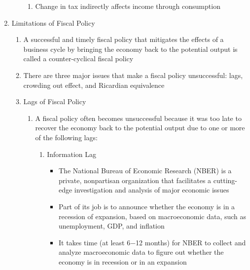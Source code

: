 \documentclass[12pt]{article}
\begin{document}
\begin{enumerate}
\begin{enumerate}
\begin{enumerate}
              \item Change in tax indirectly affects income through consumption

            \end{enumerate}

        \end{enumerate}

      \item Limitations of Fiscal Policy

        \begin{enumerate}

          \item A successful and timely fiscal policy that mitigates the effects of a business cycle by bringing the economy back to the potential output is called a counter-cyclical fiscal policy

          \item There are three major issues that make a fiscal policy unsuccessful: lags, crowding out effect, and Ricardian equivalence


          \item Lags of Fiscal Policy


            \begin{enumerate}

              \item A fiscal policy often becomes unsuccessful because it was too late to recover the economy back to the potential output due to one or more of the following lags:

                \begin{enumerate}

                  \item Information Lag

                    \begin{itemize}

                      \item The National Bureau of Economic Research (NBER) is a private, nonpartisan organization that facilitates a cutting-edge investigation and analysis of major economic issues

                      \item Part of its job is to announce whether the economy is in a recession of expansion, based on macroeconomic data, such as unemployment, GDP, and inflation

                      \item It takes time (at least 6$-$12 months) for NBER to collect and analyze macroeconomic data to figure out whether the economy is in recession or in an expansion


\end{itemize}
\end{enumerate}
\end{enumerate}
\end{enumerate}
\end{enumerate}
\end{document}
